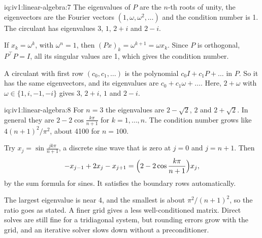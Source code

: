 \begin{solution}{iq:iv1:linear-algebra:7}
The eigenvalues of $P$ are the $n$-th roots of unity, the eigenvectors are the Fourier vectors $(1, \omega, \omega^2, \dots)$ and the condition number is 1. The circulant has eigenvalues $3$, $1$, $2 + i$ and $2 - i$.

If $x_k = \omega^k$, with $\omega^n = 1$, then $(Px)_k = \omega^{k + 1} = \omega x_k$. Since $P$ is orthogonal, $P^\top P = I$, all its singular values are 1, which gives the condition number.

A circulant with first row $(c_0, c_1, \dots)$ is the polynomial $c_0I + c_1P + \dots$ in $P$. So it has the same eigenvectors, and its eigenvalues are $c_0 + c_1\omega + \dots$. Here, $2 + \omega$ with $\omega \in \{1, i, -1, -i\}$ gives $3$, $2 + i$, $1$ and $2 - i$.

\end{solution}

\begin{solution}{iq:iv1:linear-algebra:8}
For $n = 3$ the eigenvalues are $2 - \sqrt{2}$, $2$ and $2 + \sqrt{2}$. In general they are $2 - 2\cos\frac{k\pi}{n + 1}$ for $k = 1, \dots, n$. The condition number grows like $4(n + 1)^2/\pi^2$, about 4100 for $n = 100$.

Try $x_j = \sin\frac{jk\pi}{n + 1}$, a discrete sine wave that is zero at $j = 0$ and $j = n + 1$. Then
\[
-x_{j - 1} + 2x_j - x_{j + 1} = \Bigl(2 - 2\cos\frac{k\pi}{n + 1}\Bigr)x_j,
\]
by the sum formula for sines. It satisfies the boundary rows automatically.

The largest eigenvalue is near 4, and the smallest is about $\pi^2/(n + 1)^2$, so the ratio goes as stated. A finer grid gives a less well-conditioned matrix. Direct solves are still fine for a tridiagonal system, but rounding errors grow with the grid, and an iterative solver slows down without a preconditioner.

\end{solution}

